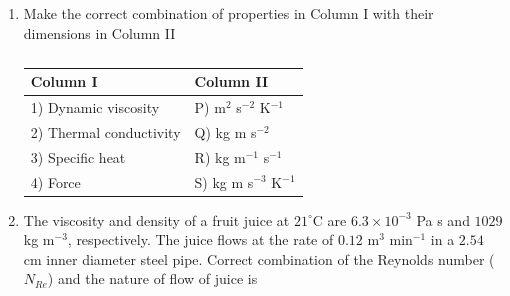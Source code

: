 \documentclass[a4paper,10pt]{article}
\begin{document}
\begin{enumerate}
    \hfill{}
    
    \item Make the correct combination of properties in Column I with their dimensions in Column II
    \begin{table}[h!] \centering \caption*{} \label{tab:q18_food}
        \begin{tabular}{ll} \hline
            \textbf{Column I} & \textbf{Column II} \\ \hline
            1) Dynamic viscosity & P) m$^2$ s$^{-2}$ K$^{-1}$ \\
            2) Thermal conductivity & Q) kg m s$^{-2}$ \\
            3) Specific heat & R) kg m$^{-1}$ s$^{-1}$ \\
            4) Force & S) kg m s$^{-3}$ K$^{-1}$ \\ \hline
        \end{tabular}
    \end{table}
    
    \hfill{}
    \begin{enumerate}[label=\Alph*)]
    \end{enumerate}
    
    \item The viscosity and density of a fruit juice at $21^\circ$C are $6.3 \times 10^{-3}$ Pa s and $1029$ kg m$^{-3}$, respectively. The juice flows at the rate of $0.12$ m$^3$ min$^{-1}$ in a $2.54$ cm inner diameter steel pipe. Correct combination of the Reynolds number ($N_{Re}$) and the nature of flow of juice is
    
    \hfill{}
    \begin{enumerate}[label=\Alph*)]
    \end{enumerate}
    

\end{enumerate}
\end{document}
